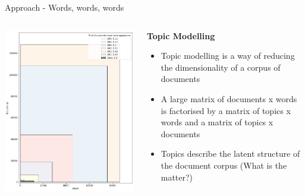 \documentclass[9pt]{beamer}
\begin{document}
\begin{frame}{Approach - Words, words, words}

\begin{columns}
\begin{column}{0.5\linewidth}
	\begin{center}
		\includegraphics[width=\linewidth]{../plots/volume_variety_bible_AR6}
	\end{center}
\end{column}
\begin{column}{0.5\linewidth}
	\textbf{Topic Modelling}
	\begin{center}
		\begin{itemize}
			\item Topic modelling is a way of reducing the dimensionality of a corpus of documents
			\item A large matrix of documents x words is factorised by
			a matrix of topics x words and a matrix of topics x documents
			\citep{Lee1999}
			\item Topics describe the latent structure of the document corpus (What is the matter?)
			
		\end{itemize}
	\end{center}
\end{column}
\end{columns}

\end{frame}
\end{document}
